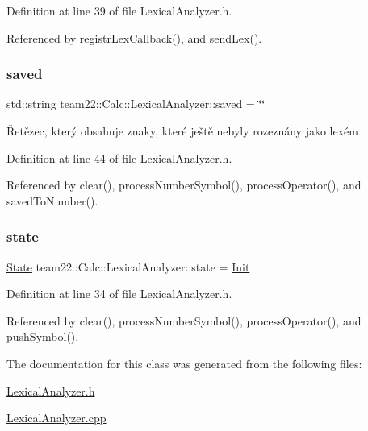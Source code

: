 Definition at line 39 of file Lexical\+Analyzer.\+h.



Referenced by registr\+Lex\+Callback(), and send\+Lex().

\mbox{\label{classteam22_1_1_calc_1_1_lexical_analyzer_afd063de2c3d792b5688c863eb5135968}} 
\subsubsection{\texorpdfstring{saved}{saved}}
{\footnotesize\ttfamily std\+::string team22\+::\+Calc\+::\+Lexical\+Analyzer\+::saved = \char`\"{}\char`\"{}\hspace{0.3cm}{\ttfamily [private]}}

Řetězec, který obsahuje znaky, které ještě nebyly rozeznány jako lexém 

Definition at line 44 of file Lexical\+Analyzer.\+h.



Referenced by clear(), process\+Number\+Symbol(), process\+Operator(), and saved\+To\+Number().

\mbox{\label{classteam22_1_1_calc_1_1_lexical_analyzer_ad0f4710b09bf91a00d11846a7ef036ab}} 
\subsubsection{\texorpdfstring{state}{state}}
{\footnotesize\ttfamily \hyperlink{classteam22_1_1_calc_1_1_lexical_analyzer_aef11ba66454715a80d5964c07f6d8cc3}{State} team22\+::\+Calc\+::\+Lexical\+Analyzer\+::state = \hyperlink{classteam22_1_1_calc_1_1_lexical_analyzer_aef11ba66454715a80d5964c07f6d8cc3a11976214c837f23fd71b2af8b0de3d5b}{Init}\hspace{0.3cm}{\ttfamily [private]}}



Definition at line 34 of file Lexical\+Analyzer.\+h.



Referenced by clear(), process\+Number\+Symbol(), process\+Operator(), and push\+Symbol().



The documentation for this class was generated from the following files\+:\begin{DoxyCompactItemize}
\item 
\hyperlink{_lexical_analyzer_8h}{Lexical\+Analyzer.\+h}\item 
\hyperlink{_lexical_analyzer_8cpp}{Lexical\+Analyzer.\+cpp}\end{DoxyCompactItemize}
